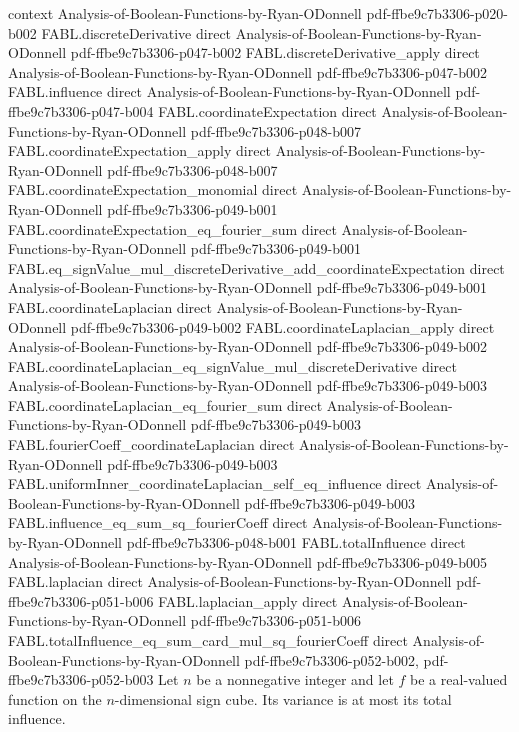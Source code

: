 \begin{theorem}
  {context}
  {Analysis-of-Boolean-Functions-by-Ryan-ODonnell}
  {pdf-ffbe9c7b3306-p020-b002}
\proofstep
  {FABL.discreteDerivative}
  {direct}
  {Analysis-of-Boolean-Functions-by-Ryan-ODonnell}
  {pdf-ffbe9c7b3306-p047-b002}
\proofstep
  {FABL.discreteDerivative_apply}
  {direct}
  {Analysis-of-Boolean-Functions-by-Ryan-ODonnell}
  {pdf-ffbe9c7b3306-p047-b002}
\proofstep
  {FABL.influence}
  {direct}
  {Analysis-of-Boolean-Functions-by-Ryan-ODonnell}
  {pdf-ffbe9c7b3306-p047-b004}
\proofstep
  {FABL.coordinateExpectation}
  {direct}
  {Analysis-of-Boolean-Functions-by-Ryan-ODonnell}
  {pdf-ffbe9c7b3306-p048-b007}
\proofstep
  {FABL.coordinateExpectation_apply}
  {direct}
  {Analysis-of-Boolean-Functions-by-Ryan-ODonnell}
  {pdf-ffbe9c7b3306-p048-b007}
\proofstep
  {FABL.coordinateExpectation_monomial}
  {direct}
  {Analysis-of-Boolean-Functions-by-Ryan-ODonnell}
  {pdf-ffbe9c7b3306-p049-b001}
\proofstep
  {FABL.coordinateExpectation_eq_fourier_sum}
  {direct}
  {Analysis-of-Boolean-Functions-by-Ryan-ODonnell}
  {pdf-ffbe9c7b3306-p049-b001}
\proofstep
  {FABL.eq_signValue_mul_discreteDerivative_add_coordinateExpectation}
  {direct}
  {Analysis-of-Boolean-Functions-by-Ryan-ODonnell}
  {pdf-ffbe9c7b3306-p049-b001}
\proofstep
  {FABL.coordinateLaplacian}
  {direct}
  {Analysis-of-Boolean-Functions-by-Ryan-ODonnell}
  {pdf-ffbe9c7b3306-p049-b002}
\proofstep
  {FABL.coordinateLaplacian_apply}
  {direct}
  {Analysis-of-Boolean-Functions-by-Ryan-ODonnell}
  {pdf-ffbe9c7b3306-p049-b002}
\proofstep
  {FABL.coordinateLaplacian_eq_signValue_mul_discreteDerivative}
  {direct}
  {Analysis-of-Boolean-Functions-by-Ryan-ODonnell}
  {pdf-ffbe9c7b3306-p049-b003}
\proofstep
  {FABL.coordinateLaplacian_eq_fourier_sum}
  {direct}
  {Analysis-of-Boolean-Functions-by-Ryan-ODonnell}
  {pdf-ffbe9c7b3306-p049-b003}
\proofstep
  {FABL.fourierCoeff_coordinateLaplacian}
  {direct}
  {Analysis-of-Boolean-Functions-by-Ryan-ODonnell}
  {pdf-ffbe9c7b3306-p049-b003}
\proofstep
  {FABL.uniformInner_coordinateLaplacian_self_eq_influence}
  {direct}
  {Analysis-of-Boolean-Functions-by-Ryan-ODonnell}
  {pdf-ffbe9c7b3306-p049-b003}
\proofstep
  {FABL.influence_eq_sum_sq_fourierCoeff}
  {direct}
  {Analysis-of-Boolean-Functions-by-Ryan-ODonnell}
  {pdf-ffbe9c7b3306-p048-b001}
\proofstep
  {FABL.totalInfluence}
  {direct}
  {Analysis-of-Boolean-Functions-by-Ryan-ODonnell}
  {pdf-ffbe9c7b3306-p049-b005}
\proofstep
  {FABL.laplacian}
  {direct}
  {Analysis-of-Boolean-Functions-by-Ryan-ODonnell}
  {pdf-ffbe9c7b3306-p051-b006}
\proofstep
  {FABL.laplacian_apply}
  {direct}
  {Analysis-of-Boolean-Functions-by-Ryan-ODonnell}
  {pdf-ffbe9c7b3306-p051-b006}
\proofstep
  {FABL.totalInfluence_eq_sum_card_mul_sq_fourierCoeff}
  {direct}
  {Analysis-of-Boolean-Functions-by-Ryan-ODonnell}
  {pdf-ffbe9c7b3306-p052-b002,
    pdf-ffbe9c7b3306-p052-b003}
Let $n$ be a nonnegative integer and let $f$ be a real-valued function on the
$n$-dimensional sign cube. Its variance is at most its total influence.
\end{theorem}

